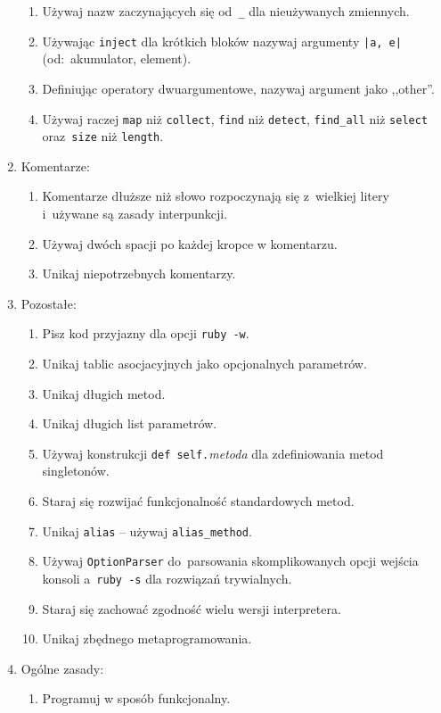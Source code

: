 \begin{enumerate}
\begin{enumerate}
    \item Używaj nazw zaczynających się od~\texttt{\_} dla nieużywanych zmiennych.
    \item Używając \texttt{inject} dla krótkich bloków nazywaj argumenty \texttt{|a, e|} (od:~akumulator, element).
    \item Definiując operatory dwuargumentowe, nazywaj argument jako ,,other''.
    \item Używaj raczej \texttt{map} niż \texttt{collect}, \texttt{find} niż \texttt{detect}, \texttt{find\_all} niż \texttt{select} oraz~\texttt{size} niż \texttt{length}.
  \end{enumerate}
  \item Komentarze:
  \begin{enumerate}
    \item Komentarze dłuższe niż słowo rozpoczynają się z~wielkiej litery i~używane są zasady interpunkcji.
    \item Używaj dwóch spacji po każdej kropce w komentarzu.
    \item Unikaj niepotrzebnych komentarzy.
  \end{enumerate}
  \item Pozostałe:
  \begin{enumerate}
    \item Pisz kod przyjazny dla opcji \texttt{ruby -w}.
    \item Unikaj tablic asocjacyjnych jako opcjonalnych parametrów.
    \item Unikaj długich metod.
    \item Unikaj długich list parametrów.
    \item Używaj konstrukcji \texttt{def self.}\textit{metoda} dla zdefiniowania metod singletonów.
    \item Staraj się rozwijać funkcjonalność standardowych metod.
    \item Unikaj \texttt{alias} -- używaj \texttt{alias\_method}.
    \item Używaj \texttt{OptionParser} do~parsowania skomplikowanych opcji wejścia konsoli a~\texttt{ruby -s} dla rozwiązań trywialnych.
    \item Staraj się zachować zgodność wielu wersji interpretera.
    \item Unikaj zbędnego metaprogramowania.
  \end{enumerate}
  \item Ogólne zasady:
  \begin{enumerate}
    \item Programuj w sposób funkcjonalny.

\end{enumerate}
\end{enumerate}
